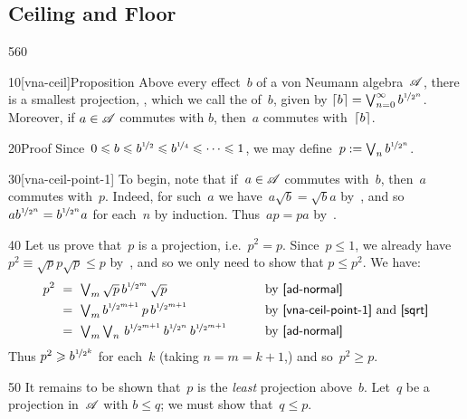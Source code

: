 \subsection{Ceiling and Floor}
\begin{parsec}{560}%
\begin{point}{10}[vna-ceil]{Proposition}%
Above every effect~$b$ of a von Neumann algebra~$\scrA$,
there is a smallest projection, ,%
which we call the %
of~$b$,
 given by $\ceil{b}=\bigvee_{n=0}^\infty b^{\nicefrac{1}{2^n}}$.\\
Moreover, if $a\in \scrA$ commutes with $b$,
then~$a$ commutes with~$\ceil{b}$.
\begin{point}{20}{Proof}
Since~$0\leq b\leq b^{\nicefrac{1}{2}}\leq
b^{\nicefrac{1}{4}}\leq\dotsb\leq 1$,
    we may define~$p:=\bigvee_n b^{\nicefrac{1}{2^n}}$.
\begin{point}{30}[vna-ceil-point-1]%
To begin,
note that if~$a\in \scrA$
commutes with~$b$,
then~$a$ commutes with~$p$.
Indeed, for such~$a$ we have~$a\sqrt{b}=\sqrt{b}a$
by~,
and so $a b^{\nicefrac{1}{2^n}} = b^{\nicefrac{1}{2^n}} a$
for each~$n$
by induction.
Thus~$ap=pa$ by~.
\end{point}
\begin{point}{40}%
Let us prove that~$p$ is a projection, i.e.~$p^2=p$. 
Since~$p\leq 1$, we already have $p^2\equiv \sqrt{p}p\sqrt{p}\leq p$
by~,
and so we only need to show that $p\leq p^2$. We have:
\begin{alignat*}{3}
 p^2 \ &=\  \textstyle \bigvee_m \sqrt{p} \,b^{\nicefrac{1}{2^m}} \,\sqrt{p}
\qquad&&\text{by \sref{ad-normal}} \\
&=\ \textstyle\bigvee_m b^{\nicefrac{1}{2^{m+1}}}\, p\,
b^{\nicefrac{1}{2^{m+1}}} 
\qquad&&\text{by \sref{vna-ceil-point-1} and \sref{sqrt}} \\
&=\ \textstyle \bigvee_m \bigvee_n \, 
b^{\nicefrac{1}{2^{m+1}}}\, b^{\nicefrac{1}{2^n}}\,
b^{\nicefrac{1}{2^{m+1}}} \qquad && \text{by \sref{ad-normal}}
\end{alignat*}
Thus $p^2 \geq b^{\nicefrac{1}{2^k}}$
for each~$k$ (taking $n=m=k+1$,)
and so~$p^2 \geq p$.
\end{point}
\begin{point}{50}%
It remains to be shown that~$p$ is the \emph{least} projection
above~$b$.
Let~$q$ be a projection in~$\scrA$ with $b\leq q$;
we must show that~$q\leq p$.

\end{point}
\end{point}
\end{point}
\end{parsec}
